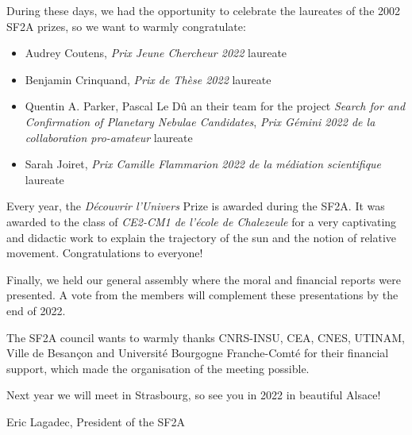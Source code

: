 During these days, we  had the opportunity to celebrate the laureates of the 2002 SF2A prizes, so we want to warmly congratulate:

\begin{itemize}
    \item Audrey Coutens, \emph{Prix Jeune Chercheur 2022} laureate
    \item Benjamin Crinquand, \emph{Prix de Thèse 2022} laureate
    \item Quentin A. Parker, Pascal Le D\^u  an their team for the project \emph{Search for and Confirmation of Planetary Nebulae Candidates}, \emph{Prix Gémini 2022 de la collaboration pro-amateur} laureate
    \item Sarah Joiret, \emph{Prix Camille Flammarion 2022 de la médiation scientifique} laureate
\end{itemize}
Every year, the \emph{Découvrir l'Univers} Prize is awarded during the SF2A. It was awarded to the class of \emph{CE2-CM1 de l'école de Chalezeule}  for a very captivating and didactic work to explain the trajectory of the sun and the notion of relative movement. Congratulations to everyone!

Finally, we held our general assembly where the moral and financial reports were presented. A vote from the members will complement these presentations by the end of 2022.


The SF2A council wants to warmly thanks CNRS-INSU, CEA, CNES, UTINAM, Ville de Besançon and Université Bourgogne Franche-Comté for their financial support, which made the organisation of the meeting possible. 

%
Next year we will meet in Strasbourg, so see you in 2022 in beautiful Alsace!


\begin{center}
Eric Lagadec, 
President of the SF2A 
\end{center}


%





